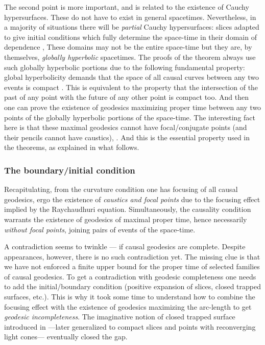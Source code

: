 \documentclass[12pt]{iopart}
\begin{document}
The second point is more important, and is related to the existence of Cauchy hypersurfaces. These do not have to exist in general spacetimes. Nevertheless, in a majority of situations there will be {\em partial} Cauchy hypersurfaces: slices adapted to give initial conditions which fully determine the space-time in their domain of dependence \cite{Ge3,P5,HE}, These domains may not be the entire space-time but they are, by themselves, {\it globally hyperbolic} spacetimes. The proofs of the theorem always use such globally hyperbolic portions due to the following fundamental property: global hyperbolicity demands that the space of all causal curves between any two events is compact \cite{Le}. This is equivalent to the property that the intersection of the past of any point with the future of any other point is compact too. And then one can prove the existence of geodesics maximizing proper time between any two points of the globally hyperbolic portions of the space-time. The interesting fact here is that these maximal geodesics cannot have focal/conjugate points (and their pencils cannot have caustics), \cite{P5,HE,BE,O}. And this is the essential property used in the theorems, as explained in what follows.


\subsubsection{The boundary/initial condition}\label{subsubsec:boundcond}
Recapitulating, from the curvature condition one has
focusing of all causal geodesics, ergo the existence of 
{\em caustics and focal points} due to the focusing effect implied by the Raychaudhuri equation. 
Simultaneously, the causality condition warrants the existence of geodesics of maximal proper time, hence 
necessarily {\em without focal points}, joining pairs of events of the space-time.

A contradiction seems to twinkle --- if causal geodesics are complete. Despite appearances, however, there is no such contradiction yet. The missing clue is that we have not enforced a finite upper bound for the proper time of 
selected families of causal  geodesics. To get a contradiction with geodesic completeness one needs to add the initial/boundary condition (positive expansion of slices, closed trapped surfaces, etc.). This is why it took some time to understand how to  
combine the focusing effect with the existence of 
geodesics maximizing the arc-length to get {\em geodesic 
incompleteness}. 
The imaginative notion of closed trapped surface introduced in \cite{P} ---later generalized to compact slices and points with reconverging light cones--- eventually closed the gap.
\end{document}
